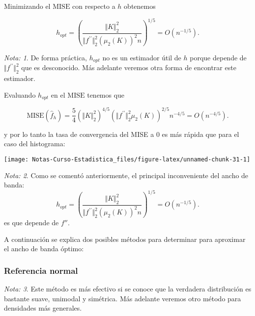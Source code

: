 \documentclass[
  12pt,
]{book}
\theoremstyle{definition}
\theoremstyle{definition}
\theoremstyle{definition}
\theoremstyle{definition}
\theoremstyle{remark}
\newtheorem*{remark}{Nota: }
\begin{document}
Minimizando el \(\mathrm{MISE}\) con respecto a \(h\) obtenemos

\begin{equation*}
h_{opt}=\left(\frac{\Vert K\Vert_{2}^{2}}{\Vert f^{\prime\prime}\Vert_{2}^{2}\left(\mu_{2}(K)\right)^{2}n}\right)^{1/5}=O\left( n^{-1/5} \right).
\end{equation*}

\begin{remark}
De forma práctica, \(h_{opt}\) no es un estimador útil de \(h\) porque depende de \(\Vert f^{\prime\prime}\Vert_{2}^{2}\) que es desconocido. Más adelante veremos otra forma de encontrar este estimador.
\end{remark}

Evaluando \(h_{opt}\) en el \(\mathrm{MISE}\) tenemos que

\begin{equation*}
\mathrm{MISE}(\hat{f}_{h})=\frac{5}{4}\left(\Vert K\Vert_{2}^{2}\right)^{4/5}\left(\Vert f^{\prime\prime}\Vert_{2}^{2}\mu_{2}(K)\right)^{2/5}n^{-4/5} = O\left( n^{-4/5} \right).
\end{equation*}

y por lo tanto la tasa de convergencia del MISE a 0 es más rápida que para el caso del histograma:

\begin{center}\texttt{[image: Notas-Curso-Estadistica\_files/figure-latex/unnamed-chunk-31-1]} \end{center}

\begin{remark}
Como se comentó anteriormente, el principal inconveniente del ancho de banda:
\begin{equation*}
h_{opt}=\left(\frac{\Vert K\Vert_{2}^{2}}{\Vert f^{\prime\prime}\Vert_{2}^{2}\left(\mu_{2}(K)\right)^{2}n}\right)^{1/5}=O\left( n^{-1/5} \right).
\end{equation*}
es que depende de \(f''\).
\end{remark}

A continuación se explica dos posibles métodos para determinar para aproximar el ancho de banda óptimo:

\hypertarget{referencia-normal}{%
\subsubsection{Referencia normal}\label{referencia-normal}}

\begin{remark}
Este método es más efectivo si se conoce que la verdadera distribución es bastante suave, unimodal y simétrica. Más adelante veremos otro método para densidades más generales.
\end{remark}
\end{document}

